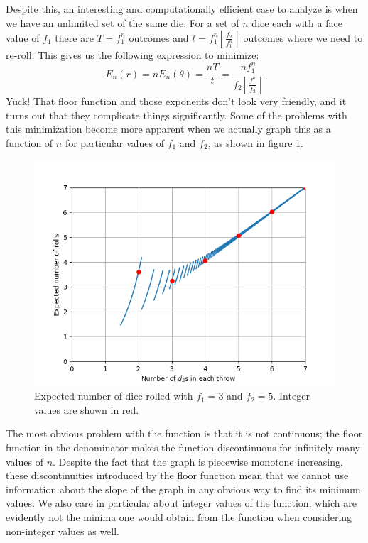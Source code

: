 \documentclass{article}
\begin{document}
\par Despite this, an interesting and computationally efficient case to analyze is when we have an unlimited set of the same die.
For a set of $n$ dice each with a face value of $f_1$ there are $T = f_1^n$ outcomes and $t = f_1^n \left\lfloor \frac{f_2}{f_1^n} \right\rfloor$ outcomes where we need to re-roll.
This gives us the following expression to minimize: $$E_n(r) = nE_n(\theta)= \frac{nT}{t} = \frac{nf_1^n}{f_2 \left \lfloor \frac{f_1^n}{f_2} \right \rfloor}$$
Yuck! 
That floor function and those exponents don't look very friendly, and it turns out that they complicate things significantly.
Some of the problems with this minimization become more apparent when we actually graph this as a function of $n$ for particular values of $f_1$ and $f_2$, as shown in figure \ref{fig:num-rolls}.
\begin{figure}
    \centering
    \includegraphics[scale=0.5]{num-rolls.png}
    \caption{Expected number of dice rolled with $f_1=3$ and $f_2=5$. Integer values are shown in red.}
    \label{fig:num-rolls}
\end{figure}
The most obvious problem with the function is that it is not continuous; the floor function in the denominator makes the function discontinuous for infinitely many values of $n$.
Despite the fact that the graph is piecewise monotone increasing, these discontinuities introduced by the floor function mean that we cannot use information about the slope of the graph in any obvious way to find its minimum values.
We also care in particular about integer values of the function, which are evidently not the minima one would obtain from the function when considering non-integer values as well.
\end{document}
